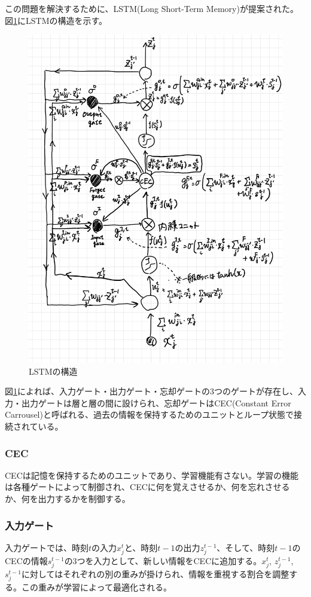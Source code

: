\documentclass{ltjsarticle}
\begin{document}
この問題を解決するために、LSTM(Long Short-Term Memory)が提案された。
図\ref{fig:LSTM}にLSTMの構造を示す。
\begin{figure}[htbp]
  \centering
  \includegraphics[width=13cm]{./capture/LSTM-33.jpg}
  \caption{LSTMの構造}
  \label{fig:LSTM}
\end{figure}

\newpage

図\ref{fig:LSTM}によれば、入力ゲート・出力ゲート・忘却ゲートの3つのゲートが存在し、入力・出力ゲートは層と層の間に設けられ、忘却ゲートはCEC(Constant Error Carrousel)と呼ばれる、過去の情報を保持するためのユニットとループ状態で接続されている。
\subsubsection{CEC}
CECは記憶を保持するためのユニットであり、学習機能有さない。学習の機能は各種ゲートによって制御され、CECに何を覚えさせるか、何を忘れさせるか、何を出力するかを制御する。
\subsubsection{入力ゲート}
入力ゲートでは、時刻$t$の入力$x_j^t$と、時刻$t-1$の出力$z_j^{t-1}$、そして、時刻$t-1$のCECの情報$s_j^{t-1}$の3つを入力として、新しい情報をCECに追加する。$x_j^t$, $z_j^{t-1}$, $s_j^{t-1}$に対してはそれぞれの別の重みが掛けられ、情報を重視する割合を調整する。この重みが学習によって最適化される。
\end{document}
